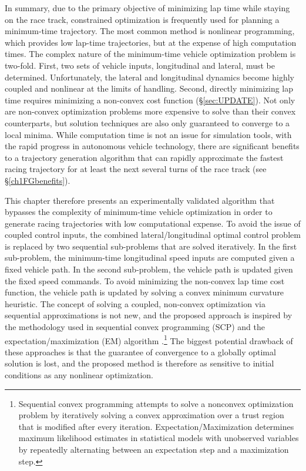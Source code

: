   In summary, due to the primary objective of minimizing lap time while staying on the race track, constrained optimization
  is frequently used for planning a minimum-time trajectory. The most common method 
  is nonlinear programming, which provides low lap-time trajectories, but at the expense of 
  high computation times. The complex nature of the minimum-time vehicle optimization problem is two-fold. First, two sets of vehicle inputs, longitudinal and
 lateral, must be determined. Unfortunately, the lateral and longitudinal dynamics become highly coupled and nonlinear at the limits of handling. Second, directly minimizing
 lap time requires minimizing a non-convex cost function (\S \ref{sec:UPDATE}). Not only are non-convex optimization problems more expensive to solve than their convex counterparts, but
 solution techniques are also only guaranteed to converge to a local minima. While computation time is not an issue for
 simulation tools, with the rapid progress in autonomous vehicle technology, there are significant benefits
 to a trajectory generation algorithm that can rapidly approximate the fastest racing trajectory for at least
 the next several turns of the race track (see \S \ref{ch1FGbenefits}). 
 
 This chapter therefore presents an experimentally validated algorithm that bypasses the complexity of minimum-time vehicle
 optimization in order to generate racing trajectories with low computational expense. To avoid the issue of coupled control inputs, the combined
 lateral/longitudinal optimal control problem is replaced by two sequential sub-problems that are solved iteratively. In the first
 sub-problem, the minimum-time longitudinal speed inputs are computed given
 a fixed vehicle path. In the second sub-problem, the vehicle path is updated given the fixed speed commands. To avoid minimizing
the non-convex lap time cost function, the vehicle path is updated by solving a convex minimum curvature heuristic. The concept of solving a coupled, 
non-convex optimization via sequential approximations is not new, and the proposed approach is inspired by the methodology used in sequential convex
programming (SCP) and the expectation/maximization (EM) algorithm \cite{diehl}\cite{tibstibs}.\footnote{Sequential convex programming attempts to solve a nonconvex optimization problem by iteratively solving a convex approximation over a trust region that is modified after every iteration. Expectation/Maximization
determines maximum likelihood estimates in statistical models with unobserved variables by repeatedly alternating between an expectation step and a maximization step. } 
The biggest potential drawback of these approaches is that the guarantee of 
convergence to a globally optimal solution is lost, and the proposed method is therefore as sensitive to initial conditions as any nonlinear optimization.    
 
